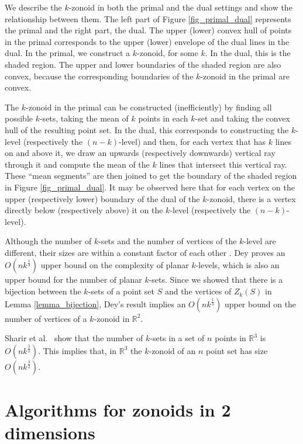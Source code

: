 \documentclass{elsart}
\begin{document}
We describe the $k$-zonoid in both the primal and the dual settings
and show the relationship between them. The left part of Figure
\ref{fig_primal_dual} represents the primal and the right part, the
dual. The upper (lower) convex hull of points in the primal
corresponds to the upper (lower) envelope of the dual lines in the
dual. In the primal, we construct a $k$-zonoid, for some $k$. In the
dual, this is the shaded region. The upper and lower boundaries of the
shaded region are also convex, because the corresponding boundaries of
the $k$-zonoid in the primal are convex. 

The $k$-zonoid in the primal can be constructed (inefficiently) by
finding all possible $k$-sets, taking the mean of $k$ points in each
$k$-set and taking the convex hull of the resulting point set. In the
dual, this corresponds to constructing the $k$-level (respectively the
$(n-k)$-level) and then, for each vertex that has $k$ lines on and
above it, we draw an upwards (respectively downwards) vertical ray
through it and compute the mean of the $k$ lines that intersect this
vertical ray. These ``mean segments'' are then joined to get the
boundary of the shaded region in Figure \ref{fig_primal_dual}. It may
be observed here that for each vertex on the upper (respectively
lower) boundary of the dual of the $k$-zonoid, there is a vertex
directly below (respectively above) it on the $k$-level (respectively
the $(n-k)$-level). 

Although the number of $k$-sets and the number of vertices of the
$k$-level are different, their sizes are within a constant factor of
each other \cite{edelsbrunner_book}. Dey
\cite{improved_bounds_on_planar_ksets_and_klevels} proves an
$O(nk^{\frac{1}{3}})$ upper bound on the complexity of planar
$k$-levels, which is also an upper bound for the number of planar
$k$-sets. Since we showed that there is a bijection between the
$k$-sets of a point set $S$ and the vertices of $Z_k(S)$ in Lemma
\ref{lemma_bijection}, Dey's result implies an $O(nk^{\frac{1}{3}})$
upper bound on the number of vertices of a $k$-zonoid in
$\mathbb{R}^2$.

Sharir et al.\ \cite{an_improved_bound_for_ksets_in_three_dimensions}
show that the number of $k$-sets in a set of $n$ points in
$\mathbb{R}^3$ is $O(nk^{\frac{3}{2}})$. This implies that, in
$\mathbb{R}^3$ the $k$-zonoid of an $n$ point set has size
$O(nk^{\frac{3}{2}})$.



\section{Algorithms for zonoids in 2 dimensions}
\label{section_algorithms_for_zonoids_in_2_dimensions}
\end{document}
